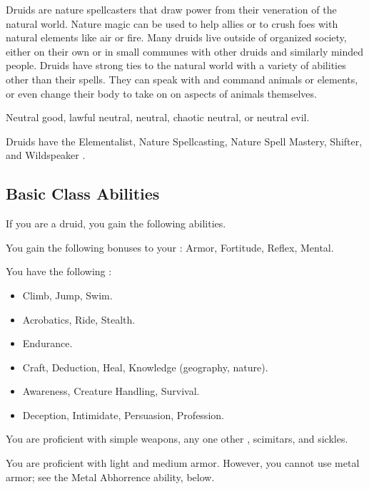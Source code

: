     Druids are nature spellcasters that draw power from their veneration of the natural world.
    Nature magic can be used to help allies or to crush foes with natural elements like air or fire.
    Many druids live outside of organized society, either on their own or in small communes with other druids and similarly minded people.
    Druids have strong ties to the natural world with a variety of abilities other than their spells.
    They can speak with and command animals or elements, or even change their body to take on on aspects of animals themselves.

     Neutral good, lawful neutral, neutral, chaotic neutral, or neutral evil.

     Druids have the Elementalist, Nature Spellcasting, Nature Spell Mastery, Shifter, and Wildspeaker .

    \subsection{Basic Class Abilities}
        If you are a druid, you gain the following abilities.

        You gain the following bonuses to your :  Armor,  Fortitude,  Reflex,  Mental.

        You have the following :
        \begin{itemize}
            \item {} Climb, Jump, Swim.
            \item {} Acrobatics, Ride, Stealth.
            \item {} Endurance.
            \item {} Craft, Deduction, Heal, Knowledge (geography, nature).
            \item {} Awareness, Creature Handling, Survival.
            \item {} Deception, Intimidate, Persuasion, Profession.
        \end{itemize}

        You are proficient with simple weapons, any one other , scimitars, and sickles.

        You are proficient with light and medium armor.
        However, you cannot use metal armor; see the Metal Abhorrence ability, below.

